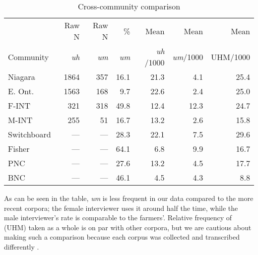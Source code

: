 \documentclass{article}
\begin{document}
\begin{table}[ht!]
    \centering
    \begin{tabular}{lrrrrrr}
        \toprule
                  & Raw N       & Raw N       & \%          & Mean              & Mean             & Mean		\\
        Community & \textit{uh} & \textit{um} & \textit{um} & \textit{uh} /1000 & \textit{um}/1000 & UHM/1000	\\
        \midrule
        Niagara   & 1864        & 357         & 16.1        & 21.3              & 4.1              & 25.4	\\
        E. Ont.   & 1563        & 168         & 9.7         & 22.6              & 2.4              & 25.0		\\
        F-INT     & 321         & 318         & 49.8        & 12.4              & 12.3             & 24.7		\\
        M-INT     & 255         & 51          & 16.7        & 13.2              & 2.6              & 15.8		\\
        \midrule
        Switchboard  & ---         & ---         & 28.3        & 22.1              & 7.5              & 29.6		\\
        Fisher    & ---         & ---         & 64.1        & 6.8               & 9.9              & 16.7		\\
        PNC       & ---         & ---         & 27.6        & 13.2              & 4.5              & 17.7		\\
        BNC       & ---         & ---         & 46.1        & 4.5               & 4.3              & 8.8			\\
        \bottomrule
    \end{tabular}
    \caption{Cross-community comparison}
    \label{t:comparison}
\end{table}

As can be seen in the table, \emph{um} is less frequent in our data compared to
the more recent corpora; the female interviewer uses it around half the time,
while the male interviewer's rate is comparable to the farmers'.
Relative frequency of (UHM) taken as a whole is on par with other corpora, but
we are cautious about making such a comparison because each corpus was collected
and transcribed differently \parencite[for related discussion,
see][]{pichler2010}.

\printbibliography
\end{document}
